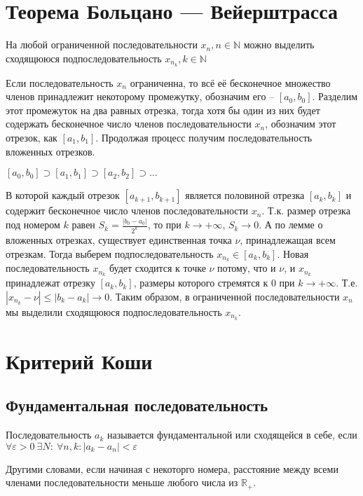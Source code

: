\section[Т. Больцано]{Теорема Больцано — Вейерштрасса}
\begin{theorem}
На любой ограниченной последовательности $x_n, n \in \mathbb{N}$ можно выделить сходящююся 
подпоследовательность $x_{n_k}, k \in \mathbb{N}$
\end{theorem}
Если последовательность $x_n$ ограниченна, то всё её бесконечное множество членов принадлежит 
некоторому промежутку, обозначим его -- $[a_0, b_0]$. Разделим этот промежуток на два равных 
отрезка, тогда хотя бы один из них будет содержать бесконечное число членов последовательности 
$x_n$, обозначим этот отрезок, как $[a_1, b_1]$. Продолжая процесс получим последовательность 
вложенных отрезков.
\begin{center}$[a_0, b_0] \supset [a_1, b_1] \supset [a_2, b_2] \supset \ldots$\end{center}
В которой каждый отрезок $[a_{k+1}, b_{k+1}]$ является половиной отрезка $[a_{k}, b_{k}]$ и содержит 
бесконечное число членов последовательности $x_n$. Т.к. размер отрезка под номером $k$ равен 
$S_k=\frac{|b_0-a_0|}{2^k}$, то при $k \to +\infty$, $S_k \to 0$. А по лемме о вложенных отрезках, 
существует единственная точка $\nu$, принадлежащая всем отрезкам.
Тогда выберем подпоследовательность $x_{n_k} \in [a_k, b_k]$. Новая последовательность $x_{n_k}$ 
будет сходится к точке $\nu$ потому, что и $\nu$, и $x_{n_k}$ принадлежат отрезку $[a_k, b_k]$, 
размеры которого стремятся к $0$ при $k \to +\infty$. Т.е. $|x_{n_k}-\nu| \leq |b_k - a_k| \to 0$. 
Таким образом, в ограниченной последовательности $x_n$ мы выделили сходящююся подпоследовательность 
$x_{n_k}$.

\section{Критерий Коши}
\subsection{Фундаментальная последовательность}
\begin{mydef}
Последовательность $a_k$ называется фундаментальной или сходящейся в себе, если $\forall \varepsilon 
> 0 \ \exists N: \ \forall n,k: |a_k - a_n| < \varepsilon$
\end{mydef}
Другими словами, если начиная с некоторго номера, расстояние между всеми членами последовательности 
меньше любого числа из $\mathbb{R}_+$.
